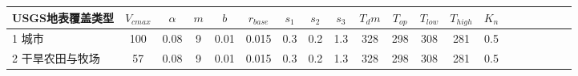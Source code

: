 \begin{sidewaystable}[]
    \centering
    \caption{USGS植被光合作用参数。$V_{cmax}$表示植被冠层顶部 25\textcelsius 时光合最大羧化速率($\rm mol\ m^{-2}\ s^{-1}$)，$\alpha$为量子转化效率(0.05 $\rm mol\ CO_2 mol^{-1}$ photon)，$m$为气孔导度经验拟合经验参数(无量纲)，$b$为最小气孔导度($\rm mol\ CO_2\ m^{-2}s^{-1}$) ，
    $r_{base}$为叶基础呼吸速率系数(unitless)，$s_1$是高温抑制系数($\rm K^{-1}$)，$s_2$是低温抑制系数($\rm K^{-1}$)，$s_3$是叶呼吸高温抑制系数($\rm K^{-1}$)和$T_{dm}$是叶呼吸高温抑制温度参数(K)。}
    \label{tab:USGS植被光合作用参数1}
    \begin{tabular}{@{}lccccccccccccccccccc@{}}
    \toprule
    USGS地表覆盖类型     &$ V_{cmax}$ & $\alpha$ & $m$& $b$ & $r_{base}$ & $s_1$ & $s_2$ & $s_3$ & $T_dm$ & $T_{op}$ & $T_{low}$ & $T_{high}$ & $K_n$  \\ \midrule
    1 城市           & 100                                                               & 0.08                                                                                                   & 9                                                                                  & 0.01                                                                               & 0.015                                                               & 0.3                                                       & 0.2                                                       & 1.3                                                       & 328                                                             & 298                                                             & 308                                                              & 281                                                               & 0.5                                                          \\
    2 干旱农田与牧场      & 57                                                                & 0.08                                                                                                   & 9                                                                                  & 0.01                                                                               & 0.015                                                               & 0.3                                                       & 0.2                                                       & 1.3                                                       & 328                                                             & 298                                                             & 308                                                              & 281                                                               & 0.5                                                          \\

\end{tabular}
\end{sidewaystable}
